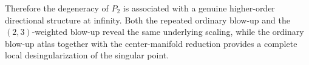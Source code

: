 \documentclass[11pt,reqno]{amsart}
\theoremstyle{plain}
\theoremstyle{definition}
\theoremstyle{remark}
\begin{document}
Therefore the degeneracy of $P_2$ is associated with a genuine
higher-order directional structure at infinity. Both the repeated
ordinary blow-up and the $(2,3)$-weighted blow-up reveal the same
underlying scaling, while the ordinary blow-up atlas together with
the center-manifold reduction provides a complete local
desingularization of the singular point.






\end{document}
